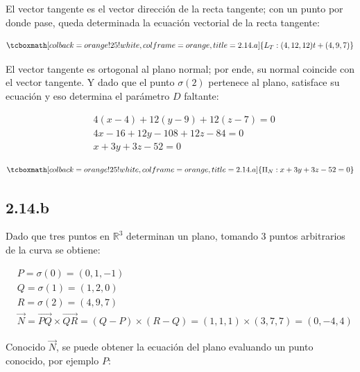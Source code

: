\documentclass{article}
\renewcommand{\Bbb}{\mathbb}
\begin{document}
El vector tangente es el vector dirección de la recta tangente; con un punto por donde pase, queda determinada la ecuación vectorial de la recta tangente:

\begin{equation}
\tcboxmath[colback=orange!25!white,colframe=orange,title=2.14.a]
{
L_T : (4, 12, 12) t + (4, 9, 7)
}
\end{equation}

El vector tangente es ortogonal al plano normal; por ende, su normal coincide con el vector tangente. Y dado que el punto $\sigma(2)$ pertenece al plano, satisface su ecuación y eso determina el parámetro $D$ faltante:

\begin{subequations}
\begin{align}
& 4 (x - 4) + 12 (y - 9) + 12 (z - 7) = 0 \\
& 4x - 16 + 12y - 108 + 12z - 84 = 0 \\
& x + 3y +3z - 52 = 0
\end{align}
\end{subequations}

\begin{equation}
\tcboxmath[colback=orange!25!white,colframe=orange,title=2.14.a]
{
\Pi_N : x + 3y + 3z - 52 = 0
}
\end{equation}

\subsection*{2.14.b}
\label{subsec:2.14.b}

Dado que tres puntos en $\Bbb R^3$ determinan un plano, tomando 3 puntos arbitrarios de la curva se obtiene:

\begin{subequations}
\begin{align}
& P = \sigma(0) = (0, 1, -1) \\
& Q = \sigma(1) = (1, 2, 0) \\
& R = \sigma(2) = (4, 9, 7) \\
& \overrightarrow{N} = \overrightarrow{PQ} \times \overrightarrow{QR} = (Q-P) \times (R-Q) = (1, 1, 1) \times (3, 7, 7) = (0, -4, 4)
\end{align}
\end{subequations}

Conocido $\overrightarrow{N}$, se puede obtener la ecuación del plano evaluando un punto conocido, por ejemplo $P$:
\end{document}
